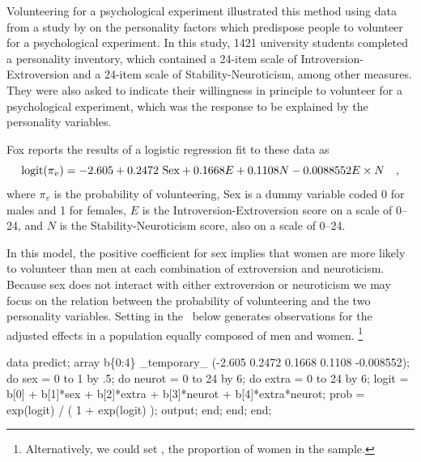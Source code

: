 \begin{Example}[davis]{Volunteering for a psychological experiment}
\citet{Fox:87} illustrated this method using data from a study by \citet{CowlesDavis:87} on the personality factors which predispose
people to volunteer for a psychological experiment.
In this study, 1421 university students completed a personality inventory,
which contained a 24-item scale of Introversion-Extroversion
and a 24-item scale of Stability-Neuroticism, among other measures.
They were also asked to indicate their willingness in principle to
volunteer for a psychological experiment, which was the response to
be explained by the personality variables.

Fox reports the results of a logistic regression fit to these data
as
\begin{equation*}
\logit ( \pi_v ) = -2.605 + 0.2472 \mbox{ Sex} + 0.1668 E + 0.1108 N - 0.0088552 E \times N \quad ,
\end{equation*}
where $\pi_v$ is the probability of volunteering, Sex is a dummy variable
coded 0 for males and 1 for females, $E$ is the Introversion-Extroversion
score on a scale of 0--24, and $N$ is the Stability-Neuroticism score,
also on a scale of 0--24.

In this model, the positive coefficient for sex implies that women are
more likely to volunteer than men at each combination of extroversion
and neuroticism.
Because sex does not interact with either extroversion or neuroticism
we may focus on the relation between the probability of volunteering
and the two personality variables.
Setting  in the \Dstp\ below generates observations
for the adjusted effects in a population equally composed of men and women.%
\footnote{Alternatively, we could set ,
the proportion of women in the sample.}
\begin{listing}
data predict;
   array b\{0:4\} _temporary_ (-2.605  0.2472  0.1668  0.1108 -0.008552);
   do sex = 0 to 1 by .5;
      do neurot = 0 to 24 by 6;
         do extra = 0 to 24 by 6;
            logit = b[0] + b[1]*sex + b[2]*extra + b[3]*neurot
                  + b[4]*extra*neurot;
            prob = exp(logit) / ( 1 + exp(logit) );
            output;
            end;
         end;
      end;
\end{listing}


\end{Example}
